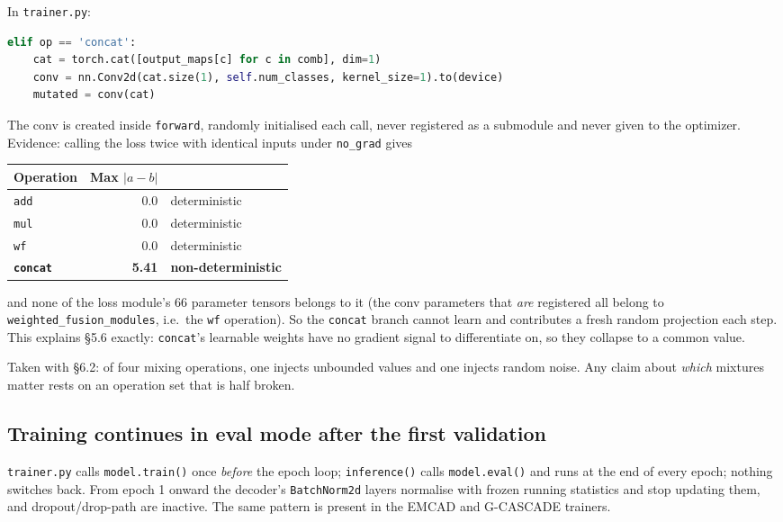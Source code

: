 \documentclass[11pt,a4paper]{article}
\newcommand{\code}[1]{\texttt{\small #1}}
\begin{document}
In \code{trainer.py}:

\begin{lstlisting}[language=Python]
elif op == 'concat':
    cat = torch.cat([output_maps[c] for c in comb], dim=1)
    conv = nn.Conv2d(cat.size(1), self.num_classes, kernel_size=1).to(device)
    mutated = conv(cat)
\end{lstlisting}

The conv is created inside \code{forward}, randomly initialised each call, never
registered as a submodule and never given to the optimizer. Evidence: calling
the loss twice with identical inputs under \code{no\_grad} gives

\begin{center}
\begin{tabular}{@{}lrl@{}}
\toprule
\textbf{Operation} & \textbf{Max $|a-b|$} & \\
\midrule
\code{add} & 0.0 & deterministic \\
\code{mul} & 0.0 & deterministic \\
\code{wf} & 0.0 & deterministic \\
\textbf{\code{concat}} & \textbf{5.41} & \textbf{non-deterministic} \\
\bottomrule
\end{tabular}
\end{center}

and none of the loss module's 66 parameter tensors belongs to it (the conv
parameters that \emph{are} registered all belong to
\code{weighted\_fusion\_modules}, i.e.\ the \code{wf} operation). So the
\code{concat} branch cannot learn and contributes a fresh random projection each
step. This explains \S5.6 exactly: \code{concat}'s learnable weights have no
gradient signal to differentiate on, so they collapse to a common value.

Taken with \S6.2: of four mixing operations, one injects unbounded values and
one injects random noise. Any claim about \emph{which} mixtures matter rests on
an operation set that is half broken.

\subsection{Training continues in eval mode after the first validation}

\code{trainer.py} calls \code{model.train()} once \emph{before} the epoch loop;
\code{inference()} calls \code{model.eval()} and runs at the end of every epoch;
nothing switches back. From epoch 1 onward the decoder's \code{BatchNorm2d}
layers normalise with frozen running statistics and stop updating them, and
dropout/drop-path are inactive. The same pattern is present in the EMCAD and
G-CASCADE trainers.
\end{document}
